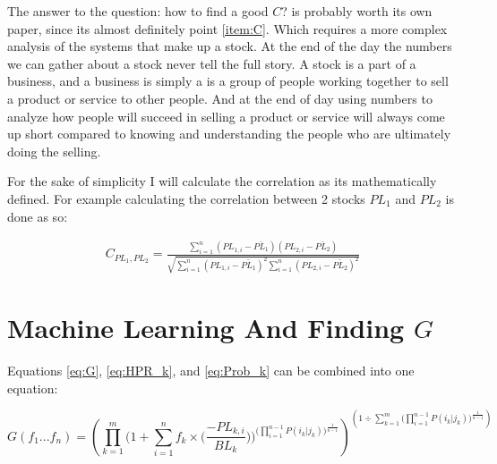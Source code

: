 \documentclass[12pt]{article}
\begin{document}
        The answer to the question: how to find a good \(C\)? is probably worth its own paper, since
        its almost definitely point \ref{item:C}. Which requires a more complex analysis of the systems
        that make up a stock. At the end of the day the numbers we can gather about a stock never
        tell the full story. A stock is a part of a business, and a business is simply a is a
        group of people working together to sell a product or service to other people.
        And at the end of day using numbers to analyze how people will succeed in selling
        a product or service will always come up short compared to knowing and understanding
        the people who are ultimately doing the selling.

        For the sake of simplicity I will calculate the correlation as its mathematically defined.
        For example calculating the correlation between 2 stocks \(PL_1\) and \(PL_2\) is
        done as so:

        \begin{align}
            C_{PL_1, PL_2} = 
            \frac{
                \displaystyle\sum^{n}_{i=1} (PL_{1, i} - \bar {PL_1})(PL_{2, i} - \bar {PL_2})
            }{
                \sqrt{
                    \displaystyle\sum^{n}_{i=1}(PL_{1,i} - \bar {PL_1})^2 
                    \displaystyle\sum^{n}_{i=1}(PL_{2,i} - \bar {PL_2})^2
                }
            }
            \label{eq:Correlation}
        \end{align}

\section{Machine Learning And Finding \(G\)}

    Equations \ref{eq:G}, \ref{eq:HPR_k}, and \ref{eq:Prob_k} can be combined into one equation:

    \begin{equation}\label{eq:FullG}
        G(f_1...f_n) = \left(
            \displaystyle\prod^{m}_{k=1} \Bigg(
                1 + \displaystyle\sum^{n}_{i=1} f_k \times \Big(
                    \frac{- PL_{k,i} }{BL_k}
                \Big) 
            \Bigg)^{\Bigg(
                \displaystyle\prod^{n - 1}_{i=1} P(i_k | j_k)
            \Bigg) ^ {\frac{1}{n - 1}}} 
        \right) ^ {
            \left( {1 \div {\displaystyle\sum^{m}_{k=1}
                \Bigg( 
                    \displaystyle\prod^{n - 1}_{i=1}  P(i_k | j_k)
                \Bigg) ^ {
                    \frac{1}{n - 1}}
                }
            }
        \right)}
    \end{equation}
\end{document}
